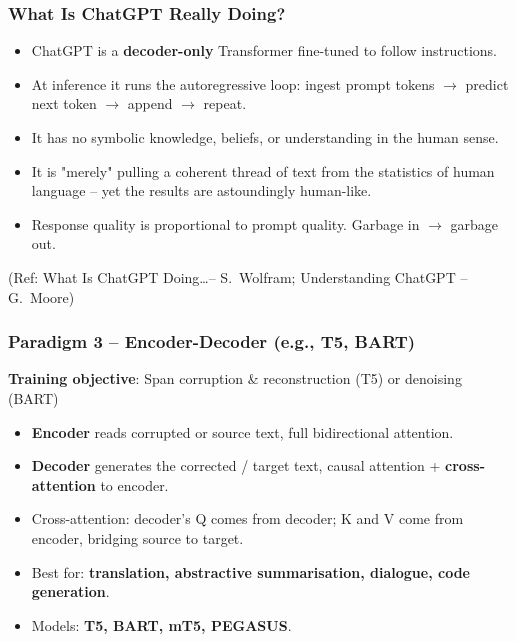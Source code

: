 \begin{frame}[fragile]\frametitle{What Is ChatGPT Really Doing?}
\begin{itemize}
\item ChatGPT is a \textbf{decoder-only} Transformer fine-tuned to follow instructions.
\item At inference it runs the autoregressive loop:
  ingest prompt tokens $\rightarrow$ predict next token $\rightarrow$ append $\rightarrow$ repeat.
\item It has no symbolic knowledge, beliefs, or understanding in the human sense.
\item It is "merely" pulling a coherent thread of text from the statistics of human language – yet the results are astoundingly human-like.
\item Response quality is proportional to prompt quality.  Garbage in $\rightarrow$ garbage out.
\end{itemize}
{\tiny (Ref: What Is ChatGPT Doing\ldots – S.\ Wolfram; Understanding ChatGPT – G.\ Moore)}
\end{frame}


\begin{frame}[fragile]\frametitle{Paradigm 3 – Encoder-Decoder (e.g., T5, BART)}
    \textbf{Training objective}: Span corruption \& reconstruction (T5) or denoising (BART)
    \begin{itemize}
    \item \textbf{Encoder} reads corrupted or source text,  full bidirectional attention.
    \item \textbf{Decoder} generates the corrected / target text,  causal attention + \textbf{cross-attention} to encoder.
    \item Cross-attention: decoder's Q comes from decoder; K and V come from encoder,  bridging source to target.
    \end{itemize}
    \vspace{0.2em}
    \begin{itemize}
    \item Best for: \textbf{translation, abstractive summarisation, dialogue, code generation}.
    \item Models: \textbf{T5, BART, mT5, PEGASUS}.
    \end{itemize}
\end{frame}

